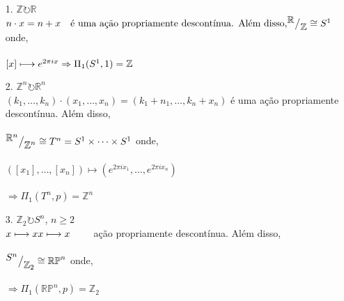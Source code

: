 \begin{ex}
	\begin{itemize}
        \item[1.] $\mathbb{Z}\circlearrowright\mathbb{R}$\\
            $n\cdot x = n+x \text{\ \ \  é uma ação propriamente descontínua. Além disso,} \\\\
            \mkern-18mu \quad{^{\textstyle \mathbb{R}}\big/_{\textstyle \mathbb{Z}}} \cong S^1$ onde,\\\\
            $[x]\longmapsto e^{2\pi ix}\\\\
            \Rightarrow \Pi_1(S^1 , 1) = \mathbb{Z}$\\
            
	    \item[2.] $\mathbb{Z}^n\circlearrowright\mathbb{R}^n$\\
            $(k_1,\dots, k_n)\cdot(x_1,\dots,x_n) = (k_1+n_1,\dots,k_n+x_n)$ é uma ação propriamente descontínua. Além disso,\\\\
            $\mkern-18mu \quad{^{\textstyle \mathbb{R}^n}\big/_{\textstyle \mathbb{Z}^n}} \cong T^n = S^1\times\dots\times S^1$ onde,\\\\
            $([x_1],\dots,[x_n])\longmapsto (e^{2\pi ix_1},\dots,e^{2\pi ix_n})$\\\\
            $\Rightarrow \Pi_1(T^n , p) = \mathbb{Z}^n$\\

        \item[3.] $\mathbb{Z}_2\circlearrowright S^n$, $n\geq2$\\
            $x\longmapsto x\\
             x\longmapsto x$ \ \ \ \ ação propriamente descontínua. Além disso,\\\\
            $\mkern-18mu \quad{^{\textstyle S^n}\big/_{\textstyle \mathbb{Z}_2}} \cong \mathbb{RP}^n$ onde,\\\\
            $\Rightarrow \Pi_1(\mathbb{RP}^n , p) = \mathbb{Z}_2$\\


\end{itemize}
\end{ex}
